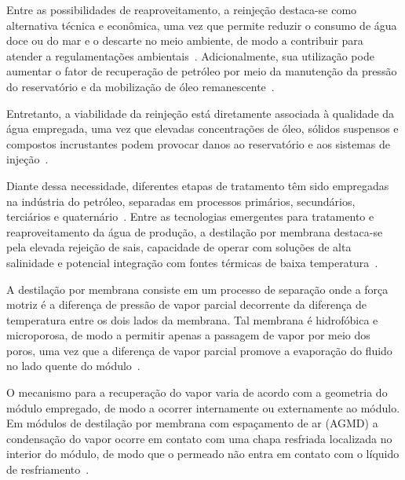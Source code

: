 Entre as possibilidades de reaproveitamento, a reinjeção destaca-se como alternativa técnica e econômica, uma vez que permite reduzir o consumo de água doce ou do mar e o descarte no meio ambiente, de modo a contribuir para atender a regulamentações ambientais~\cite{OSPAR2001,EPA435,CONAMA3932007}. Adicionalmente, sua utilização pode aumentar o fator de recuperação de petróleo por meio da manutenção da pressão do reservatório e da mobilização de óleo remanescente~\cite{Liang2018ProducedWater,Nawaz2021FO_MD}. 

Entretanto, a viabilidade da reinjeção está diretamente associada à qualidade da água empregada, uma vez que elevadas concentrações de óleo, sólidos suspensos e compostos incrustantes podem provocar danos ao reservatório e aos sistemas de injeção~\cite{BADER2007159, AKSTINAT2019124011}.

Diante dessa necessidade, diferentes etapas de tratamento têm sido empregadas na indústria do petróleo, separadas em processos primários, secundários, terciários e quaternário~\cite{Amakiri2022ProducedWaterReview,Adepitan2026HybridPW,Rajbongshi2024ProducedWaterReview,Ahmadun2009PWTechnologies}. Entre as tecnologias emergentes para tratamento e reaproveitamento da água de produção, a destilação por membrana destaca-se pela elevada rejeição de sais, capacidade de operar com soluções de alta salinidade e potencial integração com fontes térmicas de baixa temperatura~\cite{Adepitan2026HybridPW,Ghaffour2019,Mansi2022ProducedWater}.
 
A destilação por membrana consiste em um processo de separação onde a força motriz é a diferença de pressão de vapor parcial decorrente da diferença de temperatura entre os dois lados da membrana. Tal membrana é hidrofóbica e microporosa, de modo a permitir apenas a passagem de vapor por meio dos poros, uma vez que a diferença de vapor parcial promove a evaporação do fluido no lado quente do módulo~\cite{Olatunji2018MDModeling,Yan2021MDWastewater,Kaur2023MDOverview,Adewole2022MDDesalination}.

O mecanismo para a recuperação do vapor varia de acordo com a geometria do módulo empregado, de modo a ocorrer internamente ou externamente ao módulo. Em módulos de destilação por membrana com espaçamento de ar (AGMD) a condensação do vapor ocorre em contato com uma chapa resfriada localizada no interior do módulo, de modo que o permeado não entra em contato com o líquido de resfriamento~\cite{Olatunji2018MDModeling,Yan2021MDWastewater,Kaur2023MDOverview,Adewole2022MDDesalination}. 


